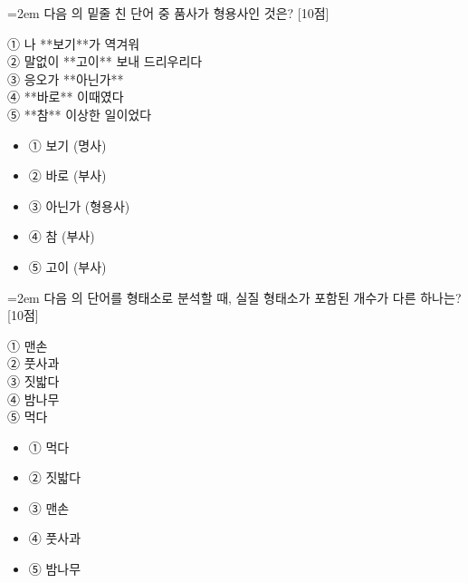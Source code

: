 \documentclass[11pt,a4paper]{article}
\newcommand{\qnum}[1]{%
  \tikz[baseline=(num.base)]{%
    \node[circle, fill=numCircle, text=white, inner sep=0pt,
          minimum size=18pt, font=\small\bfseries] (num) {#1};%
  }%
}
\newcommand{\pts}[1]{%
  \hfill\textcolor{ptsBadge}{[#1점]}%
}
\begin{document}
\vspace{4mm}
\begin{minipage}{\columnwidth}
{\hangindent=2em
\qnum{4}\enspace 다음 의 밑줄 친 단어 중 품사가 형용사인 것은? \pts{10}
\par}

\vspace{3mm}
\begin{tcolorbox}[bogi]
① 나 **보기**가 역겨워 \\{}
② 말없이 **고이** 보내 드리우리다 \\{}
③ 응오가 **아닌가** \\{}
④ **바로** 이때였다 \\{}
⑤ **참** 이상한 일이었다
\end{tcolorbox}
\vspace{3mm}
\begin{itemize}[leftmargin=2.5em, labelsep=0.3em, label={}, itemsep=4pt, parsep=1pt, topsep=0pt]
  \item ① 보기 (명사)
  \item ② 바로 (부사)
  \item ③ 아닌가 (형용사)
  \item ④ 참 (부사)
  \item ⑤ 고이 (부사)
\end{itemize}
\end{minipage}
\vspace{4mm}

\vspace{4mm}
\begin{minipage}{\columnwidth}
{\hangindent=2em
\qnum{5}\enspace 다음 의 단어를 형태소로 분석할 때, 실질 형태소가 포함된 개수가 다른 하나는? \pts{10}
\par}

\vspace{3mm}
\begin{tcolorbox}[bogi]
① 맨손 \\{}
② 풋사과 \\{}
③ 짓밟다 \\{}
④ 밤나무 \\{}
⑤ 먹다
\end{tcolorbox}
\vspace{3mm}
\begin{itemize}[leftmargin=2.5em, labelsep=0.3em, label={}, itemsep=4pt, parsep=1pt, topsep=0pt]
  \item ① 먹다
  \item ② 짓밟다
  \item ③ 맨손
  \item ④ 풋사과
  \item ⑤ 밤나무
\end{itemize}
\end{minipage}
\vspace{4mm}
\end{document}
